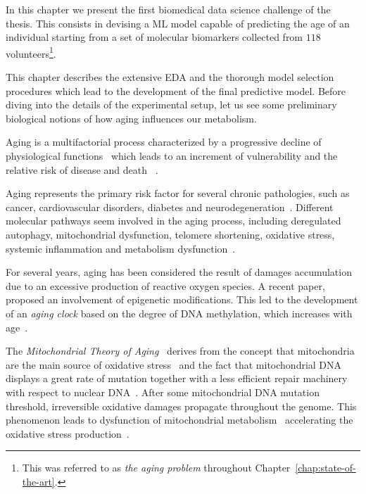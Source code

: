 In this chapter we present the first biomedical data science challenge of the thesis.
This consists in devising a ML model capable of predicting the age of an individual starting from a set of molecular biomarkers collected from $118$ volunteers\footnote{ This was referred to as \textit{the aging problem} throughout Chapter~\ref{chap:state-of-the-art}.}.

This chapter describes the extensive EDA and the thorough model selection procedures which lead to the development of the final predictive model.
Before diving into the details of the experimental setup, let us see some preliminary biological notions of how aging influences our metabolism.

Aging is a multifactorial process characterized by a progressive decline of physiological functions~\cite{campisi2013aging} which leads to an increment of vulnerability and the relative risk of disease and death ~\cite{bratic2010mitochondrial}.

Aging represents the primary risk factor for several chronic pathologies, such as cancer, cardiovascular disorders, diabetes and neurodegeneration~\cite{lopez2013hallmarks}. Different molecular pathways seem involved in the aging process, including deregulated autophagy, mitochondrial dysfunction, telomere shortening, oxidative stress, systemic inflammation and metabolism dysfunction~\cite{lopez2013hallmarks, riera2016signaling}.

For several years, aging has been considered the result of damages accumulation due to an excessive production of reactive oxygen species.
A recent paper,  \cite{thompson2017epigenetic} proposed an involvement of epigenetic modifications. This led to the development of an \textit{aging clock} based on the degree of DNA methylation, which increases with age~\cite{horvath2013dna}. 

The \textit{Mitochondrial Theory of Aging}~\cite{harman1972biologic, sastre2000mitochondrial} derives from the  concept that mitochondria are the main source of oxidative stress~\cite{cadenas2000mitochondrial, turrens2003mitochondrial, dai2014mitochondrial} and the fact that mitochondrial DNA displays a
great rate of mutation together with a less efficient repair machinery with respect to nuclear DNA~\cite{short2005decline}. After some mitochondrial DNA mutation threshold, irreversible oxidative damages propagate throughout the genome. This phenomenon leads to dysfunction of mitochondrial metabolism~\cite{genova2004mitochondrial} accelerating the oxidative stress production~\cite{wallace2010mitochondrial}.

